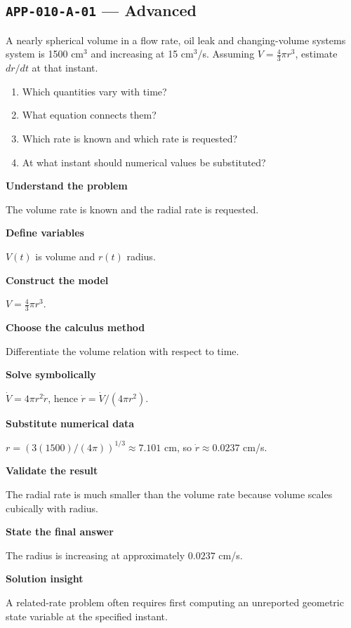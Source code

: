 \documentclass[11pt]{book}
\newcommand{\pid}[1]{\texttt{#1}}
\begin{document}
\subsection*{\pid{APP-010-A-01} — Advanced}
\begin{problembox}
A nearly spherical volume in a flow rate, oil leak and changing-volume systems system is 1500 cm$^3$ and increasing at 15 cm$^3$/s. Assuming $V=\frac43\pi r^3$, estimate $dr/dt$ at that instant.
\end{problembox}
\begin{promptbox}\begin{enumerate}
\item Which quantities vary with time?
\item What equation connects them?
\item Which rate is known and which rate is requested?
\item At what instant should numerical values be substituted?
\end{enumerate}\end{promptbox}
\begin{solutionbox}
\textbf{Understand the problem}\par The volume rate is known and the radial rate is requested.\par\medskip
\textbf{Define variables}\par $V(t)$ is volume and $r(t)$ radius.\par\medskip
\textbf{Construct the model}\par $V=\frac43\pi r^3$.\par\medskip
\textbf{Choose the calculus method}\par Differentiate the volume relation with respect to time.\par\medskip
\textbf{Solve symbolically}\par $\dot V=4\pi r^2\dot r$, hence $\dot r=\dot V/(4\pi r^2)$.\par\medskip
\textbf{Substitute numerical data}\par $r=(3(1500)/(4\pi))^{1/3}\approx 7.101$ cm, so $\dot r\approx 0.0237$ cm/s.\par\medskip
\textbf{Validate the result}\par The radial rate is much smaller than the volume rate because volume scales cubically with radius.\par\medskip
\textbf{State the final answer}\par The radius is increasing at approximately $0.0237$ cm/s.\par\medskip
\textbf{Solution insight}\par A related-rate problem often requires first computing an unreported geometric state variable at the specified instant.\par\medskip
\end{solutionbox}
\end{document}
